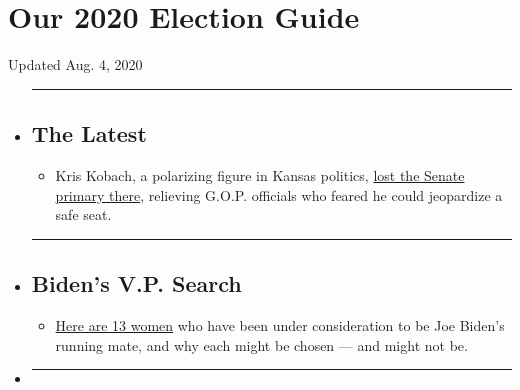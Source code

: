 \hypertarget{our-2020-election-guide}{%
\section{Our 2020 Election Guide}\label{our-2020-election-guide}}

Updated Aug. 4, 2020

\begin{itemize}
\item
  \begin{center}\rule{0.5\linewidth}{\linethickness}\end{center}

  \hypertarget{the-latest}{%
  \subsection{The Latest}\label{the-latest}}

  \begin{itemize}
  \tightlist
  \item
    Kris Kobach, a polarizing figure in Kansas politics,
    \href{https://www.nytimes3xbfgragh.onion/2020/08/04/us/politics/kobach-tlaib.html?action=click\&pgtype=Article\&state=default\&region=BELOW_MAIN_CONTENT\&context=storylines_guide}{lost
    the Senate primary there}, relieving G.O.P. officials who feared he
    could jeopardize a safe seat.
  \end{itemize}
\item
  \begin{center}\rule{0.5\linewidth}{\linethickness}\end{center}

  \hypertarget{bidens-vp-search}{%
  \subsection{Biden's V.P. Search}\label{bidens-vp-search}}

  \begin{itemize}
  \tightlist
  \item
    \href{https://www.nytimes3xbfgragh.onion/article/biden-vice-president-2020.html?action=click\&pgtype=Article\&state=default\&region=BELOW_MAIN_CONTENT\&context=storylines_guide}{Here
    are 13 women} who have been under consideration to be Joe Biden's
    running mate, and why each might be chosen --- and might not be.
  \end{itemize}
\item
  \begin{center}\rule{0.5\linewidth}{\linethickness}\end{center}


\end{itemize}
